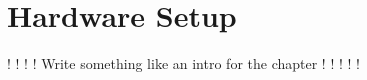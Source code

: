 \chapter{Hardware Setup}\label{ch:hardwaresetup}

! ! ! ! Write something like an intro for the chapter ! ! ! ! !